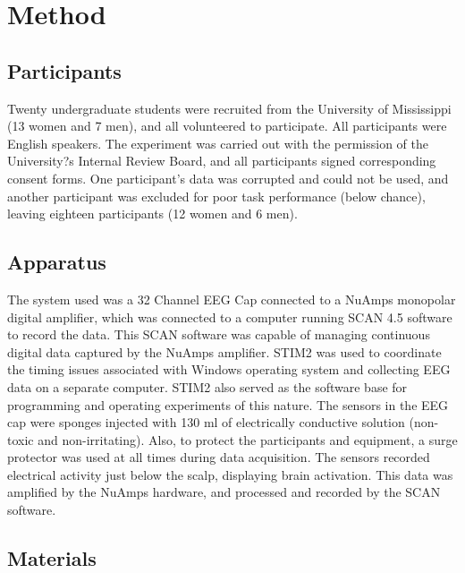 \documentclass[english,man]{apa6}
\theoremstyle{definition}
\theoremstyle{definition}
\theoremstyle{remark}
\begin{document}
\section{Method}\label{method}

\subsection{Participants}\label{participants}

Twenty undergraduate students were recruited from the University of
Mississippi (13 women and 7 men), and all volunteered to participate.
All participants were English speakers. The experiment was carried out
with the permission of the University?s Internal Review Board, and all
participants signed corresponding consent forms. One participant's data
was corrupted and could not be used, and another participant was
excluded for poor task performance (below chance), leaving eighteen
participants (12 women and 6 men).

\subsection{Apparatus}\label{apparatus}

The system used was a 32 Channel EEG Cap connected to a NuAmps monopolar
digital amplifier, which was connected to a computer running SCAN 4.5
software to record the data. This SCAN software was capable of managing
continuous digital data captured by the NuAmps amplifier. STIM2 was used
to coordinate the timing issues associated with Windows operating system
and collecting EEG data on a separate computer. STIM2 also served as the
software base for programming and operating experiments of this nature.
The sensors in the EEG cap were sponges injected with 130 ml of
electrically conductive solution (non-toxic and non-irritating). Also,
to protect the participants and equipment, a surge protector was used at
all times during data acquisition. The sensors recorded electrical
activity just below the scalp, displaying brain activation. This data
was amplified by the NuAmps hardware, and processed and recorded by the
SCAN software.

\subsection{Materials}\label{materials}
\end{document}
